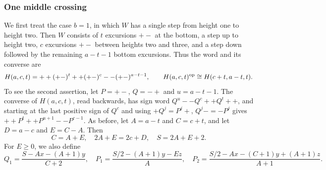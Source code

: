 \subsubsection{One middle crossing}
We first treat the case $b=1$, in which $W$ has a single step from height one to height two. Then $W$ consists of $t$ excursions $+-$ at the bottom, a step up to height two, $c$ excursions $+-$ between heights two and three, and a step down followed by the remaining $a-t-1$ bottom excursions. Thus the word and its converse are
\begin{equation}\label{singlemiddle:word}
 H(a,c,t)=++(+-)^t++(+-)^c--(+-)^{a-t-1},\qquad
 H(a,c,t)^{\rm op}\cong H(c+t,a-t,t).
\end{equation}
To see the second assertion, let $P=+-$, $Q=-+$ and $u=a-t-1$. The converse of $H(a,c,t)$, read backwards, has sign word
$Q^u--Q^c++Q^t++$, and starting at the last positive sign of $Q^c$
and using $+Q^j=P^j+$, $Q^j-=-P^j$ gives
$++P^t++P^{u+1}--P^{c-1}$.
As before, let $A=a-t$ and $C=c+t$, and let $D=a-c$ and $E=C-A$. Then
\begin{equation}\label{centralband:relations}
 C=A+E,\quad 2A+E=2c+D,\quad S=2A+E+2.
\end{equation}
For $E\ge0$, we also define
\begin{equation}\label{jointtail:Q}
 Q_1=\frac{S-Ax-(A+1)y}{C+2},\quad
 P_1=\frac{S/2-(A+1)y-Ez}{A},\quad
 P_2=\frac{S/2-Ax-(C+1)y+(A+1)z}{A+1}.
\end{equation}


